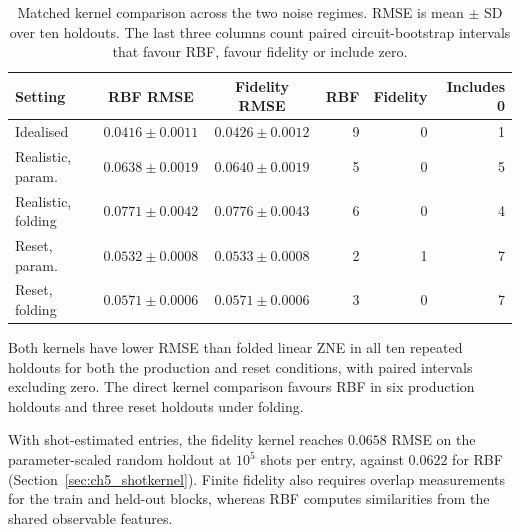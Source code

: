 \documentclass[Thesis.tex]{subfiles}
\begin{document}
\begin{table}[htbp]
\centering
\caption{Matched kernel comparison across the two noise regimes. RMSE is mean
$\pm$ SD over ten holdouts. The last three columns count paired circuit-bootstrap
intervals that favour RBF, favour fidelity or include zero.}
\label{tab:ch5_kernelcompare}
\small
\begin{tabular}{lccrrr}
\toprule
Setting & RBF RMSE & Fidelity RMSE & RBF & Fidelity & Includes 0 \\
\midrule
Idealised & $0.0416\pm0.0011$ & $0.0426\pm0.0012$ & 9 & 0 & 1 \\
Realistic, param. & $0.0638\pm0.0019$ & $0.0640\pm0.0019$ & 5 & 0 & 5 \\
Realistic, folding & $0.0771\pm0.0042$ & $0.0776\pm0.0043$ & 6 & 0 & 4 \\
Reset, param. & $0.0532\pm0.0008$ & $0.0533\pm0.0008$ & 2 & 1 & 7 \\
Reset, folding & $0.0571\pm0.0006$ & $0.0571\pm0.0006$ & 3 & 0 & 7 \\
\bottomrule
\end{tabular}
\end{table}

Both kernels have lower RMSE than folded linear ZNE in all ten
repeated holdouts for both the production and reset conditions, with
paired intervals excluding zero. The direct kernel comparison favours
RBF in six production holdouts and three reset holdouts under folding.

With shot-estimated entries, the fidelity kernel reaches $0.0658$ RMSE on the
parameter-scaled random holdout at $10^5$ shots per entry, against $0.0622$ for
RBF (Section~\ref{sec:ch5_shotkernel}). Finite fidelity also requires overlap measurements for the train and held-out
blocks, whereas RBF computes similarities from the shared observable features.
\end{document}

